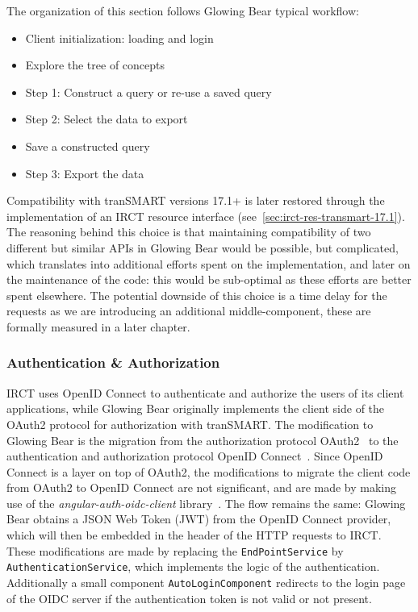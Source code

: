 
The organization of this section follows Glowing Bear typical workflow:
\begin{itemize}
    \item Client initialization: loading and login
    \item Explore the tree of concepts
    \item Step 1: Construct a query or re-use a saved query
    \item Step 2: Select the data to export
    \item Save a constructed query
    \item Step 3: Export the data
\end{itemize}

Compatibility with tranSMART versions 17.1+ is later restored through the implementation of an IRCT resource interface (see~\ref{sec:irct-res-transmart-17.1}).
The reasoning behind this choice is that maintaining compatibility of two different but similar APIs in Glowing Bear would be possible, but complicated, which translates into additional efforts spent on the implementation, and later on the maintenance of the code: this would be sub-optimal as these efforts are better spent elsewhere.
The potential downside of this choice is a time delay for the requests as we are introducing an additional middle-component, these are formally measured in a later chapter.%


\subsubsection{Authentication \& Authorization}

IRCT uses OpenID Connect to authenticate and authorize the users of its client applications, while Glowing Bear originally implements the client side of the OAuth2 protocol for authorization with tranSMART. 
The modification to Glowing Bear is the migration from the authorization protocol OAuth2~\cite{oauth2} to the authentication and authorization protocol OpenID Connect~\cite{openidconnect}.
Since OpenID Connect is a layer on top of OAuth2, the modifications to migrate the client code from OAuth2 to OpenID Connect are not significant, and are made by making use of the \emph{angular-auth-oidc-client} library~\cite{angular-auth-oidc-client}.
The flow remains the same: Glowing Bear obtains a JSON Web Token (JWT) from the OpenID Connect provider, which will then be embedded in the header of the HTTP requests to IRCT.
These modifications are made by replacing the \verb|EndPointService| by \verb|AuthenticationService|, which implements the logic of the authentication.
Additionally a small component \verb|AutoLoginComponent| redirects to the login page of the OIDC server if the authentication token is not valid or not present.

